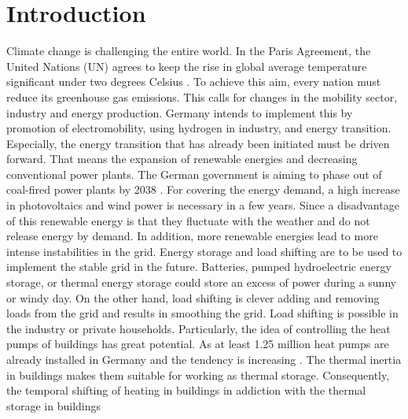 \chapter{Introduction}
\label{ch:introduction}
Climate change is challenging the entire world. In the Paris Agreement, the United Nations (UN) agrees to keep the rise in global average temperature significant under two degrees Celsius \cite{UnitedNations.2015}. To achieve this aim, every nation must reduce its greenhouse gas emissions. This calls for changes in the mobility sector, industry and energy production. Germany intends to implement this by promotion of electromobility, using hydrogen in industry, and energy transition. Especially, the energy transition that has already been initiated must be driven forward. That means the expansion of renewable energies and decreasing conventional power plants. The German government is aiming to phase out of coal-fired power plants by 2038 \cite{bundesregierung.2021}. For covering the energy demand, a high increase in photovoltaics and wind power is necessary in a few years. Since a disadvantage of this renewable energy is that they fluctuate with the weather and do not release energy by demand. In addition, more renewable energies lead to more intense instabilities in the grid. Energy storage and load shifting are to be used to implement the stable grid in the future. Batteries, pumped hydroelectric energy storage, or thermal energy storage could store an excess of power during a sunny or windy day. On the other hand, load shifting is clever adding and removing loads from the grid and results in smoothing the grid. Load shifting is possible in the industry or private households. Particularly, the idea of controlling the heat pumps of buildings has great potential. As at least 1.25 million heat pumps are already installed in Germany and the tendency is increasing \cite{BMW.2021}. The thermal inertia in buildings makes them suitable for working as thermal storage. Consequently, the temporal shifting of heating in buildings in addiction with the thermal storage in buildings 



